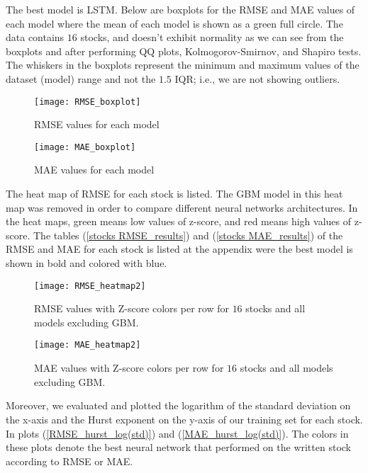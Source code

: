 \documentclass[12pt, A4]{article}
\begin{document}
The best model is LSTM. Below are boxplots for the RMSE and MAE values of each model where the mean of each model is shown as a green full circle. The data contains $16$ stocks, and doesn't exhibit normality as we can see from the boxplots and after performing QQ plots, Kolmogorov-Smirnov, and Shapiro tests. The whiskers in the boxplots represent the minimum and maximum values of the dataset (model) range and not the $1.5$ IQR; i.e., we are not showing outliers.

\begin{figure}[H]
	\centering
	\texttt{[image: RMSE\_boxplot]}
	\caption{RMSE values for each model}
	\label{RMSE_boxplot}
\end{figure}

\begin{figure}[H]
	\centering
	\texttt{[image: MAE\_boxplot]}
	\caption{MAE values for each model}
	\label{MAE_boxplot}
\end{figure}


The heat map of RMSE for each stock is listed. The GBM model in this heat map was removed in order to compare different neural networks architectures. In the heat maps, green means low values of z-score, and red means high values of z-score. The tables (\ref{stocks RMSE_results}) and (\ref{stocks MAE_results}) of the RMSE and MAE for each stock is listed at the appendix were the best model is shown in bold and colored with blue.

\begin{figure}[H]
	\centering
	\texttt{[image: RMSE\_heatmap2]}
	\caption{RMSE values with Z-score colors per row for $16$ stocks and all models excluding GBM.}
	\label{RMSE_heatmap}
\end{figure}

\begin{figure}[H]
	\centering
	\texttt{[image: MAE\_heatmap2]}
	\caption{MAE values with Z-score colors per row for $16$ stocks and all models excluding GBM.}
	\label{MAE_heatmap}
\end{figure}

Moreover, we evaluated and plotted the logarithm of the standard deviation on the x-axis and the Hurst exponent on the y-axis of our training set for each stock. In plots (\ref{RMSE_hurst_log(std)}) and (\ref{MAE_hurst_log(std)}). The colors in these plots denote the best neural network that performed on the written stock according to RMSE or MAE.
\end{document}
